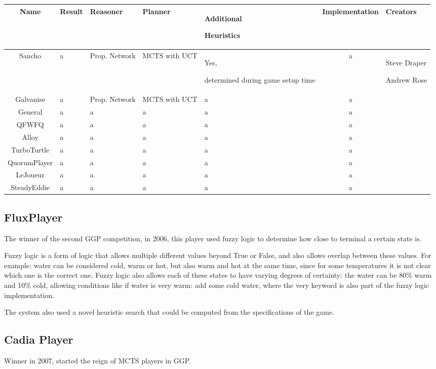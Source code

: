 \begin{tabular}{| c | p{1cm} | p{3cm} | p{3cm} | p{3cm} | c | p{2.5cm} |}
\hline
  Name & Result & Reasoner & Planner & Additional \par Heuristics & Implementation & Creators \\
\hline
  Sancho & a & Prop. Network & MCTS with UCT & Yes, \par determined during game setup time & a & Steve Draper \par Andrew Rose \\
\hline
  Galvanise & a & Prop. Network & MCTS with UCT & a & a \\
\hline
  General & a & a & a & a & a\\
  \hline
  QFWFQ & a & a & a & a & a \\
  \hline
  Alloy & a & a & a & a & a \\
\hline
  TurboTurtle & a & a & a & a & a \\
  \hline
  QuorumPlayer & a & a & a & a & a \\
    \hline
  LeJoueur & a & a & a & a & a \\
  \hline
  SteadyEddie & a & a & a & a & a \\
  
\hline
\end{tabular}



\subsection{FluxPlayer}
The winner of the second GGP competition, in 2006, this player used fuzzy logic to determine how close to terminal a certain state is.

Fuzzy logic is a form of logic that allows multiple different values beyond True or False, and also allows overlap between these values. For example: water can be considered cold, warm or hot, but also warm and hot at the same time, since for some temperatures it is not clear which one is the correct one. Fuzzy logic also allows each of these states to have varying degrees of certainty: the water can be 80\% warm and 10\% cold, allowing conditions like if water is very warm: add some cold water, where the very keyword is also part of the fuzzy logic implementation.

The system also used a novel heuristic search that could be computed from the specifications of the game.

\subsection{Cadia Player}
Winner in 2007, started the reign of MCTS players in GGP.

